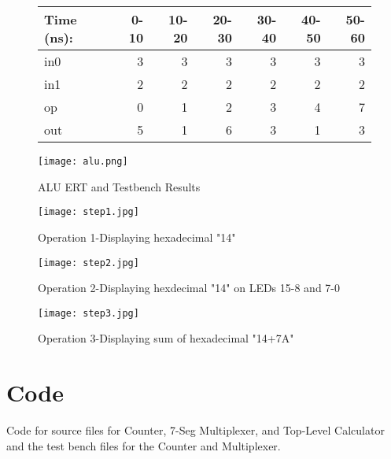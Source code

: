 \documentclass[11pt]{article}
\begin{document}
\begin{figure}[ht]\centering
	\begin{tabular}{l|rrrrrr}
		Time (ns): & 0-10 & 10-20 & 20-30 & 30-40 & 40-50 & 50-60 \\
		\midrule
		in0 & 3 & 3 & 3 & 3 & 3 & 3 \\
		in1 & 2 & 2 & 2 & 2 & 2 & 2 \\
		op & 0 & 1 & 2 & 3 & 4 & 7 \\
		\midrule
		out & 5 & 1 & 6 & 3 & 1 & 3 \\
		\bottomrule
	\end{tabular}\medskip
	
	\texttt{[image: alu.png]}
	\caption{ALU ERT and Testbench Results}
	\label{fig:sim_with_table}
\end{figure}


\clearpage

\begin{figure}[ht]\centering
	\texttt{[image: step1.jpg]}
	\caption{Operation 1-Displaying hexadecimal "14"}
	\label{fig:sim_with_table}
\end{figure}
\clearpage

\begin{figure}[ht]\centering
	\texttt{[image: step2.jpg]}
	\caption{Operation 2-Displaying hexdecimal "14" on LEDs 15-8 and 7-0}
	\label{fig:sim_with_table}
\end{figure}
\clearpage

\begin{figure}[ht]\centering
	\texttt{[image: step3.jpg]}
	\caption{Operation 3-Displaying sum of hexadecimal "14+7A"}
	\label{fig:sim_with_table}
\end{figure}
\clearpage





\section*{Code}

Code for source files for Counter, 7-Seg Multiplexer, and Top-Level Calculator and the test bench files for the Counter and Multiplexer.
\end{document}
